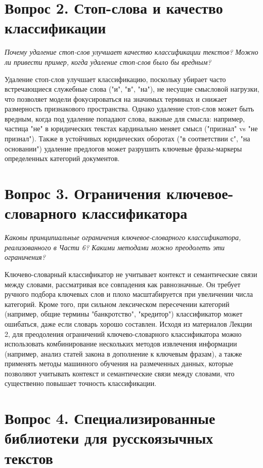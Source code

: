\documentclass[12pt, a4paper]{report}
\newcommand{\placeholder}[2][Вставьте результат]{%
  \begin{tcolorbox}[placeholderbox, title={#2}]
    #1
  \end{tcolorbox}%
  \vspace{4pt}%
}
\begin{document}
\section{Вопрос 2. Стоп-слова и качество классификации}

\textit{Почему удаление стоп-слов улучшает качество классификации текстов? Можно
ли привести пример, когда удаление стоп-слов было бы вредным?}

\placeholder[Удаление стоп-слов улучшает классификацию, поскольку убирает часто встречающиеся служебные слова ("и", "в", "на"), не несущие смысловой нагрузки, что позволяет модели фокусироваться на значимых терминах и снижает размерность признакового пространства. Однако удаление стоп-слов может быть вредным, когда под удаление попадают слова, важные для смысла: например, частица "не" в юридических текстах кардинально меняет смысл ("признал" vs "не признал"). Также в устойчивых юридических оборотах ("в соответствии с", "на основании") удаление предлогов может разрушить ключевые фразы-маркеры определенных категорий документов.]{Ответ на вопрос 2}

\section{Вопрос 3. Ограничения ключевое-словарного классификатора}

\textit{Каковы принципиальные ограничения ключевое-словарного классификатора,
реализованного в Части 6? Какими методами можно преодолеть эти ограничения?}

\placeholder[Ключево-словарный классификатор не учитывает контекст и семантические связи между словами, рассматривая все совпадения как равнозначные. Он требует ручного подбора ключевых слов и плохо масштабируется при увеличении числа категорий. Кроме того, при сильном лексическом пересечении категорий (например, общие термины "банкротство", "кредитор") классификатор может ошибаться, даже если словарь хорошо составлен. Исходя из материалов Лекции 2, для преодоления ограничений ключево-словарного классификатора можно использовать комбинирование нескольких методов извлечения информации (например, анализ статей закона в дополнение к ключевым фразам), а также применять методы машинного обучения на размеченных данных, которые позволяют учитывать контекст и семантические связи между словами, что существенно повышает точность классификации.]{Ответ на вопрос 3}

\section{Вопрос 4. Специализированные библиотеки для русскоязычных текстов}
\end{document}
